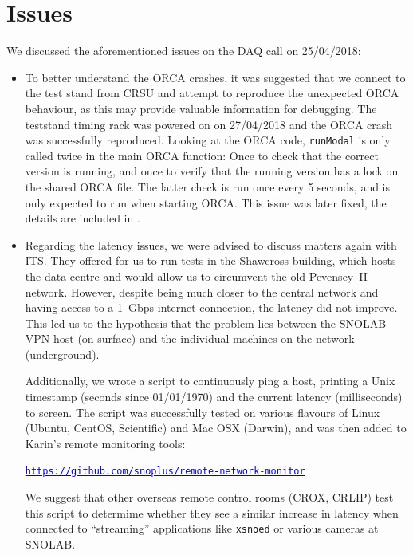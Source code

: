 \documentclass[a4paper,10pt]{article}
\newcommand{\link}[1]{\href{#1}{\textcolor{blue}{\texttt{#1}}}} %
\begin{document}
\section{Issues}
We discussed the aforementioned issues on the DAQ call on 25/04/2018:
\begin{itemize}
	\item To better understand the ORCA crashes, it was suggested that we connect to the test stand from CRSU and attempt to reproduce the unexpected ORCA behaviour, as this may provide valuable information for debugging. The teststand timing rack was powered on on 27/04/2018 and the ORCA crash was successfully reproduced. Looking at the ORCA code, {\tt runModal} is only called twice in the main ORCA function: Once to check that the correct version is running, and once to verify that the running version has a lock on the shared ORCA file. The latter check is run once every 5 seconds, and is only expected to run when starting ORCA. This issue was later fixed, the details are included in .
	
	\item Regarding the latency issues, we were advised to discuss matters again with ITS. They offered for us to run tests in the Shawcross building, which hosts the data centre and would allow us to circumvent the old Pevensey~II network. However, despite being much closer to the central network and having access to a 1~Gbps internet connection, the latency did not improve. This led us to the hypothesis that the problem lies between the SNOLAB VPN host (on surface) and the individual machines on the network (underground).
	
	Additionally, we wrote a script to continuously ping a host, printing a Unix timestamp (seconds since 01/01/1970) and the current latency (milliseconds) to screen. The script was successfully tested on various flavours of Linux (Ubuntu, CentOS, Scientific) and Mac OSX (Darwin), and was then added to Karin's remote monitoring tools:

	\qquad\link{https://github.com/snoplus/remote-network-monitor}
	
	We suggest that other overseas remote control rooms (CROX, CRLIP) test this script to determime whether they see a similar increase in latency when connected to ``streaming'' applications like {\tt xsnoed} or various cameras at SNOLAB.
\end{itemize}

\end{document}
